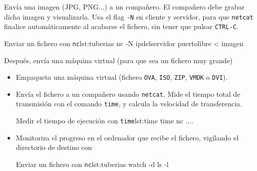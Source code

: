 \begin{homeworkProblem}


  Envía una imagen (JPG, PNG...) a un compañero. El compañero debe grabar dicha imagen y visualizarla. Usa el flag \texttt{-N} en cliente y servidor, para que \texttt{netcat} finalice automáticamente al acabarse el fichero, sin tener que pulsar \texttt{CTRL-C}.

\begin{listadoshell}{Enviar un fichero con \texttt{nc}}{lst:tuberias}
nc -N ipdelservidor puertolibre < imagen
\end{listadoshell}

  Después, envía una máquina virtual (para que sea un fichero muy grande)
  \begin{itemize}
  \item Empaqueta una máquina virtual (fichero \texttt{OVA}, \texttt{ISO}, \texttt{ZIP}, \texttt{VMDK} o \texttt{DVI}).
  \item Envía el fichero a un compañero usando \texttt{netcat}. Mide el tiempo total de transmisión con el comando \texttt{time}, y calcula la velocidad de transferencia.

\begin{listadoshell}{Medir el tiempo de ejecución con  \texttt{time}}{lst:time}
time nc ....
\end{listadoshell}
    
  \item Monitoriza el progreso en el ordenador que recibe el fichero, vigilando el directorio de destino con

\begin{listadoshell}{Enviar un fichero con \texttt{nc}}{lst:tuberias}
watch -d ls -l
\end{listadoshell}

    
  \end{itemize}
\end{homeworkProblem}

